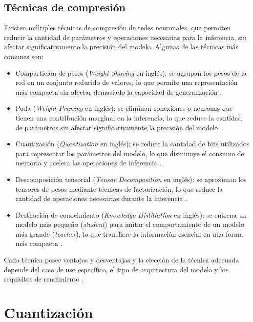 \subsection{Técnicas de compresión}
Existen múltiples técnicas de compresión de redes neuronales, que permiten reducir la cantidad de parámetros y operaciones necesarias para la inferencia, sin afectar significativamente la precisión del modelo. Algunas de las técnicas más comunes son:

\begin{itemize}
    \item Compartición de pesos (\textit{Weight Sharing} en inglés): se agrupan los pesos de la red en un conjunto reducido de valores, lo que permite una representación más compacta sin afectar demasiado la capacidad de generalización \cite{8253600}.
    \item Poda (\textit{Weight Pruning} en inglés): se eliminan conexiones o neuronas que tienen una contribución marginal en la inferencia, lo que reduce la cantidad de parámetros sin afectar significativamente la precisión del modelo \cite{8253600}.
    \item Cuantización (\textit{Quantization} en inglés): se reduce la cantidad de bits utilizados para representar los parámetros del modelo, lo que disminuye el consumo de memoria y acelera las operaciones de inferencia \cite{8253600}.
    \item Descomposición tensorial (\textit{Tensor Decomposition} en inglés): se aproximan los tensores de pesos mediante técnicas de factorización, lo que reduce la cantidad de operaciones necesarias durante la inferencia \cite{8253600}.
    \item Destilación de conocimiento (\textit{Knowledge Distillation} en inglés): se entrena un modelo más pequeño (\textit{student}) para imitar el comportamiento de un modelo más grande (\textit{teacher}), lo que transfiere la información esencial en una forma más compacta \cite{8253600}.
\end{itemize}

Cada técnica posee ventajas y desventajas y la elección de la técnica adecuada depende del caso de uso específico, el tipo de arquitectura del modelo y los requisitos de rendimiento \cite{DBLP:journals/corr/abs-2010-03954}.

\section{Cuantización}
\label{sec:cuantizacion}


